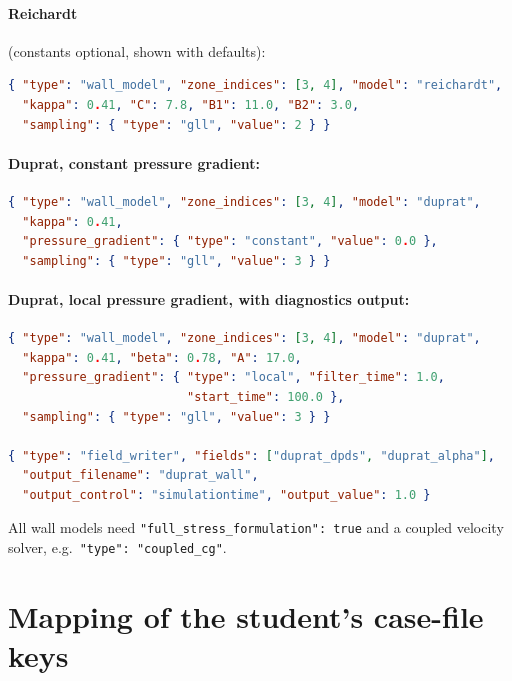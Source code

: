 \documentclass[11pt,a4paper]{article}
\newcommand{\code}[1]{\texttt{#1}}
\begin{document}
\paragraph{Reichardt} (constants optional, shown with defaults):
\begin{lstlisting}[language=json]
{ "type": "wall_model", "zone_indices": [3, 4], "model": "reichardt",
  "kappa": 0.41, "C": 7.8, "B1": 11.0, "B2": 3.0,
  "sampling": { "type": "gll", "value": 2 } }
\end{lstlisting}

\paragraph{Duprat, constant pressure gradient:}
\begin{lstlisting}[language=json]
{ "type": "wall_model", "zone_indices": [3, 4], "model": "duprat",
  "kappa": 0.41,
  "pressure_gradient": { "type": "constant", "value": 0.0 },
  "sampling": { "type": "gll", "value": 3 } }
\end{lstlisting}

\paragraph{Duprat, local pressure gradient, with diagnostics output:}
\begin{lstlisting}[language=json]
{ "type": "wall_model", "zone_indices": [3, 4], "model": "duprat",
  "kappa": 0.41, "beta": 0.78, "A": 17.0,
  "pressure_gradient": { "type": "local", "filter_time": 1.0,
                         "start_time": 100.0 },
  "sampling": { "type": "gll", "value": 3 } }

{ "type": "field_writer", "fields": ["duprat_dpds", "duprat_alpha"],
  "output_filename": "duprat_wall",
  "output_control": "simulationtime", "output_value": 1.0 }
\end{lstlisting}

\noindent All wall models need \code{"full\_stress\_formulation": true} and
a coupled velocity solver, e.g.\ \code{"type": "coupled\_cg"}.

\section{Mapping of the student's case-file keys}
\label{app:mapping}
\end{document}
